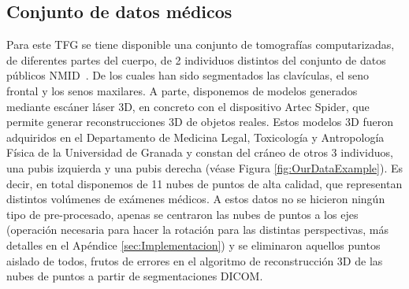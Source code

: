 \subsection{Conjunto de datos médicos}
\label{sec:OurData}
Para este TFG se tiene disponible una conjunto de tomografías computarizadas, de diferentes
partes del cuerpo, de 2 individuos distintos del conjunto de datos públicos NMID~\cite{NMID}. 
De los cuales han sido segmentados las clavículas, el seno frontal y los senos maxilares. 
A parte, disponemos de modelos generados mediante escáner láser 3D, en concreto con el dispositivo Artec Spider, que permite generar reconstrucciones 3D de objetos reales. Estos modelos 3D fueron adquiridos en el Departamento de Medicina Legal, Toxicología y Antropología Física de la Universidad de Granada y constan del cráneo de otros 3 individuos, una pubis izquierda y
una pubis derecha (véase Figura \ref{fig:OurDataExample}). Es decir, en total disponemos de 11 nubes de puntos de alta 
calidad, que representan distintos volúmenes de exámenes médicos.
A estos datos no se hicieron ningún tipo de pre-procesado, apenas se centraron 
las nubes de puntos a los ejes (operación necesaria para hacer la rotación para 
las distintas perspectivas, más detalles en el Apéndice \ref{sec:Implementacion})
y se eliminaron aquellos puntos aislado de todos, frutos de errores en el 
algoritmo de reconstrucción 3D de las nubes de puntos a partir de segmentaciones DICOM. 

